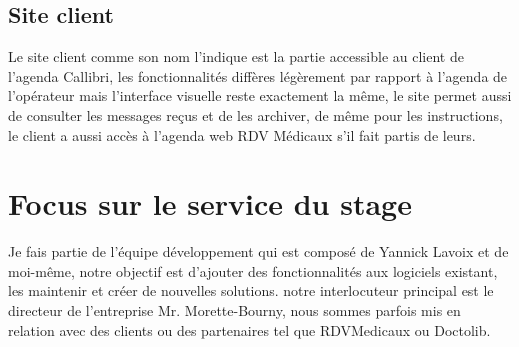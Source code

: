 \subsection{Site client}
Le site client comme son nom l'indique est la partie accessible au client de l'agenda \gls{Callibri},
les fonctionnalités diffères légèrement par rapport à l'agenda de l'opérateur mais l'interface 
visuelle reste exactement la même, le site permet aussi de consulter les messages reçus et de les archiver, de même pour les instructions,
le client a aussi accès à l'agenda web RDV Médicaux s'il fait partis de leurs.\newline


\section{Focus sur le service du stage}
Je fais partie de l'équipe développement qui est composé de Yannick Lavoix et de moi-même, 
notre objectif est d'ajouter des fonctionnalités aux logiciels existant, 
les maintenir et créer de nouvelles solutions. notre interlocuteur principal est le directeur
de l'entreprise Mr. Morette-Bourny, nous sommes parfois mis en relation avec des clients 
ou des partenaires tel que RDVMedicaux ou Doctolib. \newline

